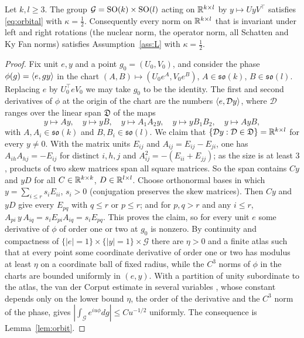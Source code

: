 \begin{lemma}\label{lem:matrices}
Let $k,l\ge3$. The group $\mathcal G=\mathrm{SO}(k)\times\mathrm{SO}(l)$ acting on $\mathbb{R}^{k\times l}$ by $y\mapsto Uy V^\top$ satisfies
\eqref{eq:orbital} with $\kappa=\frac12$. Consequently every norm on $\mathbb{R}^{k\times l}$ that is invariant under left and
right rotations (the nuclear norm, the operator norm, all Schatten and Ky Fan norms) satisfies
Assumption~\ref{ass:L} with $\kappa=\frac12$.
\end{lemma}
\begin{proof}
Fix unit $e,y$ and a point $g_0=(U_0,V_0)$, and consider the phase $\phi(g)=\langle e, gy\rangle$ in the chart
$(A,B)\mapsto(U_0e^{A},V_0e^{B})$, $A\in\mathfrak{so}(k)$, $B\in\mathfrak{so}(l)$. Replacing $e$ by $U_0^\top eV_0$ we may
take $g_0$ to be the identity. The first and second derivatives of $\phi$ at the origin of the chart are the numbers
$\langle e, \mathcal Dy\rangle$, where $\mathcal D$ ranges over the linear span $\mathfrak D$ of the maps
\[
y\mapsto Ay,\quad y\mapsto yB,\quad y\mapsto A_1A_2y,\quad y\mapsto yB_1B_2,\quad y\mapsto AyB,
\]
with $A,A_i\in\mathfrak{so}(k)$ and $B,B_i\in\mathfrak{so}(l)$.
We claim that $\{\mathcal Dy:\mathcal D\in\mathfrak D\}=\mathbb{R}^{k\times l}$ for every $y\ne0$. With the matrix units
$E_{ij}$ and $A_{ij}=E_{ij}-E_{ji}$, one has $A_{ih}A_{hj}=-E_{ij}$ for distinct $i,h,j$ and
$A_{ij}^2=-(E_{ii}+E_{jj})$; as the size is at least $3$, products of two skew matrices span all square matrices. So the
span contains $Cy$ and $yD$ for all $C\in\mathbb{R}^{k\times k}$, $D\in\mathbb{R}^{l\times l}$. Choose orthonormal bases in which
$y=\sum_{i\le r}s_iE_{ii}$, $s_i>0$ (conjugation preserves the skew matrices). Then $Cy$ and $yD$ give every $E_{pq}$
with $q\le r$ or $p\le r$; and for $p,q>r$ and any $i\le r$, $A_{pi}\,y\,A_{iq}=s_iE_{pi}A_{iq}=s_iE_{pq}$. This proves the
claim, so for every unit $e$ some derivative of $\phi$ of order one or two at $g_0$ is nonzero. By continuity and
compactness of $\{|e|=1\}\times\{|y|=1\}\times\mathcal G$ there are $\eta>0$ and a finite atlas such that at every point
some coordinate derivative of order one or two has modulus at least $\eta$ on a coordinate ball of fixed radius, while
the $C^3$ norms of $\phi$ in the charts are bounded uniformly in $(e,y)$. With a partition of unity subordinate to the
atlas, the van der Corput estimate in several variables \citep[Ch.~VIII, \S2.2, Prop.~5]{stein}, whose constant depends
only on the lower bound $\eta$, the order of the derivative and the $C^{3}$ norm of the phase, gives
$|\int_{\mathcal G}e^{iu\phi}dg|\le Cu^{-1/2}$ uniformly. The consequence is Lemma~\ref{lem:orbit}.
\end{proof}

